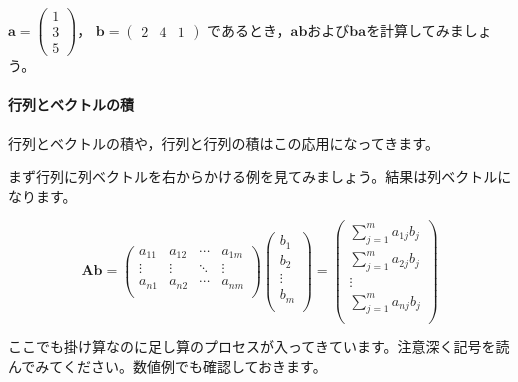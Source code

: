 \documentclass{ltjsbook}
\begin{document}
\begin{reidai}{}{}

    $\bm{a} = \begin{pmatrix} 1  \\ 3 \\ 5 \end{pmatrix}$，
    $\bm{b} = \begin{pmatrix} 2 & 4 & 1\end{pmatrix}$
    であるとき，$\bm{ab}$および$\bm{ba}$を計算してみましょう。

\end{reidai}

\paragraph{行列とベクトルの積}

行列とベクトルの積や，行列と行列の積はこの応用になってきます。

まず行列に列ベクトルを右からかける例を見てみましょう。結果は列ベクトルになります。

\begin{equation*}
    \bm{A} \bm{b} =
    \begin{pmatrix}
        a_{11} & a_{12} & \cdots & a_{1m} \\
        \vdots & \vdots & \ddots & \vdots \\
        a_{n1} & a_{n2} & \cdots & a_{nm} \\
    \end{pmatrix}
    \begin{pmatrix}
        b_1    \\
        b_2    \\
        \vdots \\
        b_m    \\
    \end{pmatrix}
    =
    \begin{pmatrix}
        \sum_{j=1}^{m} a_{1j}b_{j} \\
        \sum_{j=1}^{m} a_{2j}b_{j} \\
        \vdots                     \\
        \sum_{j=1}^{m} a_{nj}b_{j} \\
    \end{pmatrix}
\end{equation*}


ここでも掛け算なのに足し算のプロセスが入ってきています。注意深く記号を読んでみてください。数値例でも確認しておきます。
\end{document}
